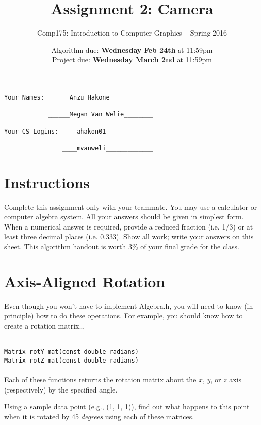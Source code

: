 \documentclass[10pt,twocolumn]{article}
\title{\Huge{\bf Assignment 2: Camera}}
\author{Comp175: Introduction to Computer Graphics -- Spring 2016}
\date{Algorithm due:  {\bf Wednesday Feb 24th} at 11:59pm\\
Project due:  {\bf Wednesday March 2nd} at 11:59pm}
\begin{document}
\maketitle

\begin{verbatim}
Your Names: ______Anzu Hakone____________

            ______Megan Van Welie________

Your CS Logins: ____ahakon01_____________

                ____mvanweli_____________
\end{verbatim}

\section{Instructions}
Complete this assignment only with your teammate. You may use a
calculator or computer algebra system. All your answers should be given in simplest form.
When a numerical answer is required, provide a reduced fraction (i.e. 1/3) or at least three
decimal places (i.e. 0.333). Show all work; write your answers on this sheet. This algorithm handout is worth 3\% of your final grade for the class.

\vspace{-0.4cm}
\section{Axis-Aligned Rotation}

Even though you won't have to implement Algebra.h, you will need to know (in principle) how to do these operations. For example, you should know how to create a rotation matrix...

\\
{\tt Matrix rotY\_mat(const double radians)}\\
{\tt Matrix rotZ\_mat(const double radians)}\\\\
Each of these functions returns the rotation matrix about the $x$, $y$, or $z$ axis (respectively) by the specified angle.
\begin{framed}
\noindent {\bf [1 point]} Using a sample data point (e.g., (1, 1, 1)), find out what happens to this point when it is rotated by 45 \emph{degrees} using each of these matrices.
\end{framed}
\end{document}

